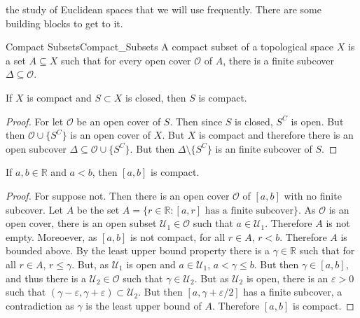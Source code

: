 \documentclass[crop=false,class=book,oneside]{standalone}                      %
\begin{document}
            the study of Euclidean spaces that we will use frequently.
            There are some building blocks to get to it.
            \begin{ldefinition}{Compact Subsets}{Compact_Subsets}
                A compact subset of a topological space $X$ is a
                set $A\subseteq{X}$ such that for every open cover
                $\mathcal{O}$ of $A$, there is a finite subcover
                $\Delta\subseteq\mathcal{O}$.
            \end{ldefinition}
            \begin{theorem}
                If $X$ is compact and
                $S\subset{X}$ is closed, then
                $S$ is compact.
            \end{theorem}
            \begin{proof}
                For let $\mathcal{O}$ be an open cover
                of $S$. Then since $S$ is closed, $S^{C}$
                is open. But then $\mathcal{O}\cup\{S^{C}\}$ is an open
                cover of $X$. But $X$ is compact and therefore
                there is an open subcover
                $\Delta\subseteq\mathcal{O}\cup\{S^{C}\}$.
                But then $\Delta\setminus\{S^{C}\}$ is an finite
                subcover of $S$.
            \end{proof}
            \begin{theorem}
                If $a,b\in\mathbb{R}$ and $a<b$, then
                $[a,b]$ is compact.
            \end{theorem}
            \begin{proof}
                For suppose not. Then there is an open
                cover $\mathcal{O}$ of $[a,b]$ with no finite
                subcover. Let $A$ be the set
                $A=\{r\in\mathbb{R}:[a,r]%
                     \textrm{ has a finite subcover}\}$.
                As $\mathcal{O}$ is an open cover, there is
                an open subset $\mathcal{U}_{1}\in\mathcal{O}$ such
                that $a\in\mathcal{U}_{1}$. Therefore $A$ is
                not empty. Moreoever, as $[a,b]$ is not compact,
                for all $r\in{A}$, $r<b$. Therefore $A$ is bounded
                above. By the least upper bound property there
                is a $\gamma\in\mathbb{R}$ such that for
                all $r\in{A}$, $r\leq\gamma$. But, as
                $\mathcal{U}_{1}$ is open and $a\in\mathcal{U}_{1}$,
                $a<\gamma\leq{b}$. But then $\gamma\in[a,b]$, and
                thus there is a $\mathcal{U}_{2}\in\mathcal{O}$ such that
                $\gamma\in\mathcal{U}_{2}$. But as $\mathcal{U}_{2}$ is
                open, there is an $\varepsilon>0$ such that
                $(\gamma-\varepsilon,\gamma+\varepsilon)\subset\mathcal{U}_{2}$.
                But then $[a,\gamma+\varepsilon/2]$ has a finite subcover,
                a contradiction as $\gamma$ is the least upper bound
                of $A$. Therefore $[a,b]$ is compact.
            \end{proof}
\end{document}
